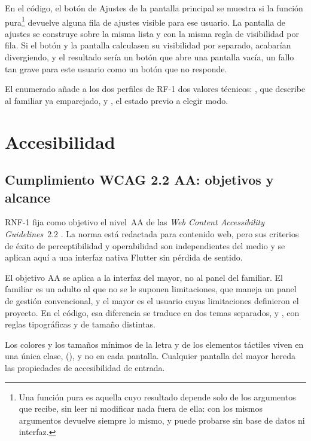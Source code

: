 En el código, el botón de Ajustes de la pantalla principal se muestra si la función pura\footnote{Una función pura es aquella cuyo resultado depende solo de los argumentos que recibe, sin leer ni modificar nada fuera de ella: con los mismos argumentos devuelve siempre lo mismo, y puede probarse sin base de datos ni interfaz.}  devuelve alguna fila de ajustes visible para ese usuario. La pantalla de ajustes se construye sobre la misma lista y con la misma regla de visibilidad por fila. Si el botón y la pantalla calculasen su visibilidad por separado, acabarían divergiendo, y el resultado sería un botón que abre una pantalla vacía, un fallo tan grave para este usuario como un botón que no responde.

El enumerado  añade a los dos perfiles de RF-1 dos valores técnicos: , que describe al familiar ya emparejado, y , el estado previo a elegir modo.

\section{Accesibilidad}
\label{sec:accesibilidad}

\subsection{Cumplimiento WCAG 2.2 AA: objetivos y alcance}

RNF-1 fija como objetivo el nivel~AA de las \emph{Web Content Accessibility Guidelines}~2.2 \autocite{wcag}. La norma está redactada para contenido web, pero sus criterios de éxito de perceptibilidad y operabilidad son independientes del medio y se aplican aquí a una interfaz nativa Flutter sin pérdida de sentido.

El objetivo AA se aplica a la interfaz del mayor, no al panel del familiar. El familiar es un adulto al que no se le suponen limitaciones, que maneja un panel de gestión convencional, y el mayor es el usuario cuyas limitaciones definieron el proyecto. En el código, esa diferencia se traduce en dos temas separados,  y , con reglas tipográficas y de tamaño distintas.

Los colores y los tamaños mínimos de la letra y de los elementos táctiles viven en una única clase,  (), y no en cada pantalla. Cualquier pantalla del mayor hereda las propiedades de accesibilidad de entrada.


